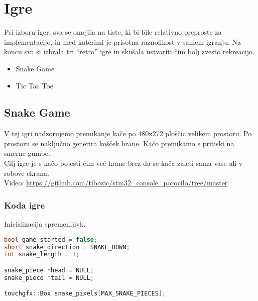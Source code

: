 \documentclass{article}
\begin{document}
\section{Igre}
\noindent
Pri izboru iger, sva se omejila na tiste, ki bi bile relativno preproste
za implementacijo, in med katerimi je prisotna raznolikost v samem
igranju. Na koncu sva si izbrala tri ``retro'' igre in sku\v{s}ala
ustvariti \v{c}im bolj zvesto rekreacijo.
\begin{itemize}
  \item Snake Game
  \item Tic Tac Toe
\end{itemize}

\subsection{Snake Game}
\noindent
V tej igri nadzorujemo premikanje ka\v{c}e po 480x272 plo\v{s}\v{c}ic
velikem prostoru. Po prostoru se naklju\v{c}no generira ko\v{s}\v{c}ek
hrane. Ka\v{c}o premikamo s pritiski na smerne gumbe. \\

\noindent
Cilj igre je s ka\v{c}o pojesti \v{c}im ve\v{c} hrane brez da se ka\v{c}a
zaleti sama vase ali v robove ekrana. \\
Video: \href{https://github.com/tibozic/stm32_console_porocilo/tree/master}{https://github.com/tibozic/stm32\_console\_porocilo/tree/master}

\subsubsection{Koda igre}
\noindent
Inicializacija spremenljivk.
\begin{lstlisting}[language=c++]
bool game_started = false;
short snake_direction = SNAKE_DOWN;
int snake_length = 1;

snake_piece *head = NULL;
snake_piece *tail = NULL;

touchgfx::Box snake_pixels[MAX_SNAKE_PIECES];
\end{lstlisting}
\end{document}
